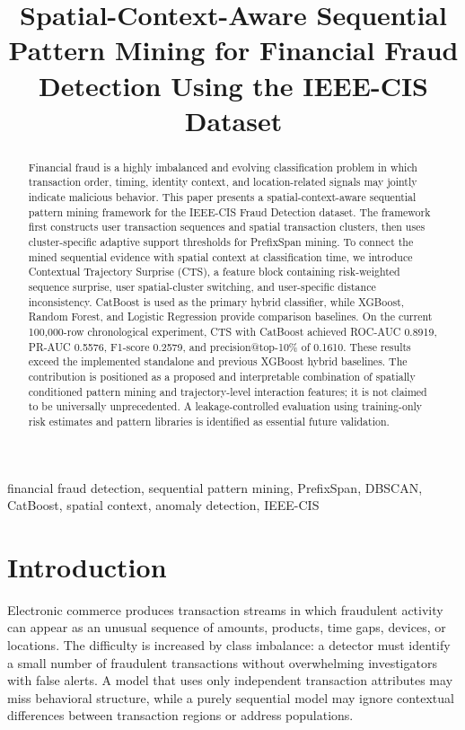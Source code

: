 \documentclass[conference]{IEEEtran}
\title{Spatial-Context-Aware Sequential Pattern Mining for Financial Fraud Detection Using the IEEE-CIS Dataset}
\author{
\IEEEauthorblockN{Gladwin Daniel P, Karthikeyan A, and Srishreyan}
\IEEEauthorblockA{VIT Chennai\\
Chennai, India}
}
\begin{document}
\maketitle

\begin{abstract}
Financial fraud is a highly imbalanced and evolving classification problem in which transaction order, timing, identity context, and location-related signals may jointly indicate malicious behavior. This paper presents a spatial-context-aware sequential pattern mining framework for the IEEE-CIS Fraud Detection dataset. The framework first constructs user transaction sequences and spatial transaction clusters, then uses cluster-specific adaptive support thresholds for PrefixSpan mining. To connect the mined sequential evidence with spatial context at classification time, we introduce Contextual Trajectory Surprise (CTS), a feature block containing risk-weighted sequence surprise, user spatial-cluster switching, and user-specific distance inconsistency. CatBoost is used as the primary hybrid classifier, while XGBoost, Random Forest, and Logistic Regression provide comparison baselines. On the current 100,000-row chronological experiment, CTS with CatBoost achieved ROC-AUC 0.8919, PR-AUC 0.5576, F1-score 0.2579, and precision@top-10\% of 0.1610. These results exceed the implemented standalone and previous XGBoost hybrid baselines. The contribution is positioned as a proposed and interpretable combination of spatially conditioned pattern mining and trajectory-level interaction features; it is not claimed to be universally unprecedented. A leakage-controlled evaluation using training-only risk estimates and pattern libraries is identified as essential future validation.
\end{abstract}

\begin{IEEEkeywords}
financial fraud detection, sequential pattern mining, PrefixSpan, DBSCAN, CatBoost, spatial context, anomaly detection, IEEE-CIS
\end{IEEEkeywords}

\section{Introduction}
Electronic commerce produces transaction streams in which fraudulent activity can appear as an unusual sequence of amounts, products, time gaps, devices, or locations. The difficulty is increased by class imbalance: a detector must identify a small number of fraudulent transactions without overwhelming investigators with false alerts. A model that uses only independent transaction attributes may miss behavioral structure, while a purely sequential model may ignore contextual differences between transaction regions or address populations.
\end{document}
